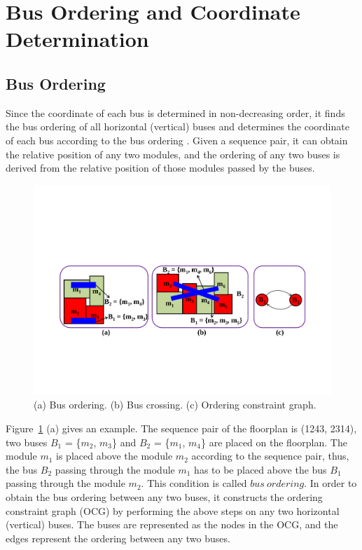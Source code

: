 \section{Bus Ordering and Coordinate Determination}
\label{sec::Bus Ordering and Coordinate Determination}
\subsection{Bus Ordering} \label{sec::Bus Ordering}
Since the coordinate of each bus is determined in non-decreasing
order, it finds the bus ordering of all horizontal (vertical)
buses and determines the coordinate of each bus according to the
bus ordering \cite{Xiang03}. Given a sequence pair, it can obtain the relative
position of any two modules, and the ordering of any two buses is
derived from the relative position of those modules passed by the
buses.

\begin{figure}[htb]
  \centering
    \includegraphics[width=12cm]{Fig/bus_ordering.pdf}
     \caption{
       (a) Bus ordering. (b) Bus crossing. (c) Ordering constraint graph.
   }
  \label{fig::bus_ordering}
\end{figure}

Figure~\ref{fig::bus_ordering} (a) gives an example. The sequence
pair of the floorplan is (1243, 2314), two buses $B_1$ = \{$m_2$,
$m_3$\} and $B_2$ = \{$m_1$, $m_4$\} are placed on the floorplan.
The module $m_1$ is placed above the module $m_2$ according to the
sequence pair, thus, the bus $B_2$ passing through the module
$m_1$ has to be placed above the bus $B_1$ passing through the
module $m_2$. This condition is called $bus\ ordering$.
In order to obtain the bus ordering between any two buses, it
constructs the ordering constraint graph (OCG) by performing the
above steps on any two horizontal (vertical) buses. The buses are
represented as the nodes in the OCG, and the edges represent the
ordering between any two buses.

